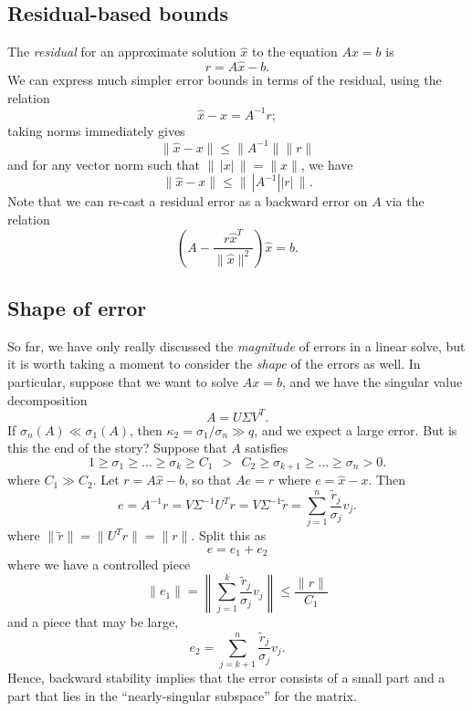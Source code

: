 \subsection{Residual-based bounds}

The {\em residual} for an approximate solution $\hat{x}$ to the
equation $Ax = b$ is
\[
  r = A \hat{x} - b.
\]
We can express much simpler error bounds in terms of the residual,
using the relation
\[
  \hat{x}-x = A^{-1} r;
\]
taking norms immediately gives
\[
  \|\hat{x}-x\| \leq \|A^{-1}\| \|r\|
\]
and for any vector norm such that $\|\,|x|\,\|=\|x\|$, we have
\[
  \|\hat{x}-x\| \leq \| \, |A^{-1}| |r| \, \|.
\]
Note that we can re-cast a residual error as a backward error on $A$
via the relation
\[
  \left( A - \frac{r\hat{x}^T}{\|\hat{x}\|^2} \right) \hat{x} = b.
\]

\subsection{Shape of error}

So far, we have only really discussed the {\em magnitude} of
errors in a linear solve, but it is worth taking a moment to
consider the {\em shape} of the errors as well.  In particular,
suppose that we want to solve $Ax = b$, and we have the
singular value decomposition
\[
  A = U \Sigma V^T.
\]
If $\sigma_n(A) \ll \sigma_1(A)$, then $\kappa_2 = \sigma_1/\sigma_n \gg q$,
and we expect a large error.  But is this the end of the story?
Suppose that $A$ satisfies
\[
  1 \geq \sigma_1 \geq \ldots \geq \sigma_k \geq C_1 ~~ > ~~
  C_2 \geq \sigma_{k+1} \geq \ldots \geq \sigma_n > 0.
\]
where $C_1 \gg C_2$.  Let $r = A \hat{x} - b$, so that $Ae = r$
where $e = \hat{x}-x$.  Then
\[
  e = A^{-1} r = V \Sigma^{-1} U^T r = V \Sigma^{-1} \tilde{r}
    = \sum_{j=1}^n \frac{\tilde{r}_j}{\sigma_j} v_j.
\]
where $\|\tilde{r}\| = \|U^T r\| = \|r\|$.  Split this as
\[
  e = e_1 + e_2
\]
where we have a controlled piece
\[
  \|e_1\| = \left\| \sum_{j=1}^k \frac{\tilde{r}_j}{\sigma_j} v_j \right\|
          \leq \frac{\|r\|}{C_1}
\]
and a piece that may be large,
\[
  e_2 = \sum_{j={k+1}}^n \frac{\tilde{r}_j}{\sigma_j} v_j.
\]
Hence, backward stability implies that the error consists of a small
part and a part that lies in the ``nearly-singular subspace'' for the
matrix.
